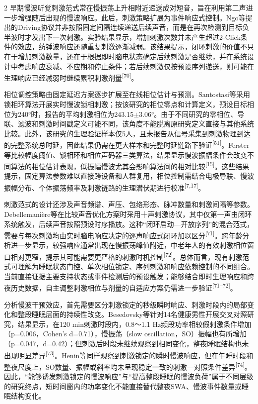 \documentclass[UTF8,zihao=5,fontset=none]{ctexart}
\newcommand{\hei}{\CJKfamily{hei}}
\newcommand{\leveltwo}[1]{%
  \par\noindent{\hei\fontsize{10.5pt}{15.6pt}\selectfont\bfseries #1\par}}
\newcommand{\refcite}[1]{\nolinebreak[4]\textsuperscript{[#1]}}
\begin{document}
\begin{multicols}{2}
早期慢波听觉刺激范式常在慢振荡上升相附近递送成对短音，旨在利用第二声进一步增强随后出现的慢波响应。此后，刺激策略扩展为事件响应式控制。Ngo等提出的Driving协议并非按照固定间隔连续递送后续声音，而是在再次检测到目标负半波时才发出下一次刺激。实验结果显示，增加刺激次数并未产生超过2-Click条件的效应，纺锤波响应还随重复刺激逐渐减弱。该结果提示，闭环刺激的价值不只在于增加刺激数量，还在于根据即时脑电状态确定后续刺激是否继续，并在系统设计中考虑响应衰减、不应期和停止条件；若后续刺激仅按预设序列递送，则可能在生理响应已经减弱时继续累积刺激剂量\refcite{70}。\par

相位调控策略由固定延迟方案逐步扩展至在线相位估计与预测。Santostasi等采用锁相环算法开展实时慢波锁相刺激；按该研究的相位零点和计算定义，预设目标相位为240°时，报告的平均刺激相位为243.15$\pm$3.06°。由于不同研究的零相位、导联、滤波和刺激时间戳定义可能不同，该角度不能脱离原研究定义直接与其他系统比较。此外，该研究的生理验证样本仅5人，且未报告从信号采集到刺激物理到达的完整系统总时延，因此结果仍需在更大样本和完整时延链路下验证\refcite{51}。Ferster等比较幅度阈值、锁相环和相位声码器三类算法，结果显示慢波振幅条件会改变不同算法的相位估计表现，低振幅慢波尤其会影响算法间的相对比较\refcite{15}。这些结果提示，固定算法参数难以直接跨设备和人群复用，相位控制需结合电极导联、慢波振幅分布、个体振荡频率及刺激链路的生理潜伏期进行校准\refcite{7,17}。\par

刺激范式的设计还涉及声音频谱、声压、包络形态、脉冲数量和刺激间隔等参数。Debellemanière等在比较声音优化方案时采用十声刺激协议，其中仅第一声由闭环系统触发，后续声音按照预设时序播放。这种“闭环启动—开放序列”的混合范式，需要与每次刺激均由实时脑电响应决定的逐声响应式闭环加以区分\refcite{71}。跨年龄分析进一步显示，较强响应通常出现在慢振荡峰值附近，中老年人的有效刺激相位窗口相对更窄，提示其可能需要更严格的刺激时机控制\refcite{72}。总体而言，现有刺激范式可理解为睡眠状态门控、单次相位锁定、序列刺激和响应依赖控制的不同组合。当前直接证据主要支持状态或事件检测后的预设触发；能够结合即时生理响应和跨夜历史数据，自主调整刺激相位与剂量的自适应方案仍需进一步验证\refcite{71--72}。\par

\leveltwo{3.2 慢波与纺锤活动调制及其耦合的生理证据}

分析慢波干预效应，首先需要区分刺激锁定的秒级瞬时响应、刺激时段内的局部变化和整段睡眠层面的持续性改变。Besedovsky等针对14名健康男性开展交叉对照研究，结果显示，在120 min刺激时段内，0.8～1.1 Hz频段功率相较假刺激条件增加（p=0.006，Cohen's d=0.71），慢振荡（slow oscillation，SO）振幅也有所增加（p=0.047，d=0.42）；但刺激后时段未继续观察到相同变化，整夜睡眠结构也未出现明显差异\refcite{73}。Henin等同样观察到刺激锁定的瞬时慢波响应，但在午睡时段和整夜尺度上，SO数量、振幅或斜率均未呈现稳定一致的刺激—对照条件差异\refcite{74}。因此，“能够诱发刺激锁定的慢波响应”与“提高整段睡眠的慢波负荷”属于不同层级的研究终点，短时间窗内的功率变化不能直接替代整夜SWA、慢波事件数量或睡眠结构变化。\par


\end{multicols}
\end{document}
